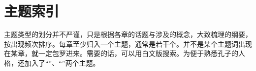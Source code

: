 \chapter*{主\quad 题\quad 索\quad 引}

主题类型的划分并不严谨，只是根据各章的话题与涉及的概念，大致梳理的纲要，按出现频次排序。每章至少归入一个主题，通常是若干个。并不是某个主题词出现在某章，就一定包罗进来。需要的话，可以用白文版搜索。为便于熟悉孔子的人格，还加入了“”、“”两个主题。

\bigskip

